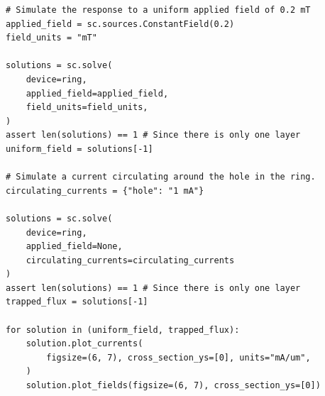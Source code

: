 \documentclass[preprint,12pt]{elsarticle}
\newenvironment{code}{\captionsetup{type=listing}}{}
\begin{document}
\begin{code}
\begin{verbatim}
# Simulate the response to a uniform applied field of 0.2 mT
applied_field = sc.sources.ConstantField(0.2)
field_units = "mT"

solutions = sc.solve(
    device=ring,
    applied_field=applied_field,
    field_units=field_units,
)
assert len(solutions) == 1 # Since there is only one layer
uniform_field = solutions[-1]

# Simulate a current circulating around the hole in the ring.
circulating_currents = {"hole": "1 mA"}

solutions = sc.solve(
    device=ring,
    applied_field=None,
    circulating_currents=circulating_currents
)
assert len(solutions) == 1 # Since there is only one layer
trapped_flux = solutions[-1]

for solution in (uniform_field, trapped_flux):
    solution.plot_currents(
        figsize=(6, 7), cross_section_ys=[0], units="mA/um",
    )
    solution.plot_fields(figsize=(6, 7), cross_section_ys=[0])
\end{verbatim}
\label{code:ring_circulating_current}
\end{code}




\end{document}
